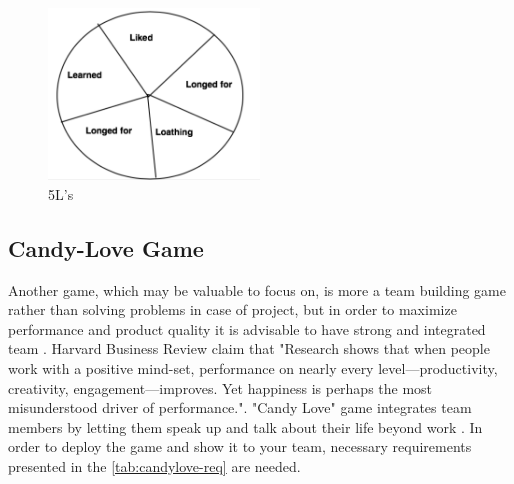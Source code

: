 \begin{figure}[h]
\caption{5L's} 
\label{fig:5Ls}
\centering
\includegraphics[width=0.5\textwidth]{img/5L}
\end{figure}

\subsection{Candy-Love Game}
Another game, which may be valuable to focus on, is more a team building game rather than solving problems in case of project, but in order to maximize performance and product quality it is advisable to have strong and integrated team \cite{ForbesArticle}. Harvard Business Review claim that "Research shows that when people work with a positive mind-set, performance on nearly every level—productivity, creativity, engagement—improves. Yet happiness is perhaps the most misunderstood driver of performance.". \cite{HarvardArticle} "Candy Love" game integrates team members by letting them speak up and talk about their life beyond work \cite{CandyLoveBibliography}. In order to deploy the game and show it to your team, necessary requirements presented in the \autoref{tab:candylove-req} are needed.

